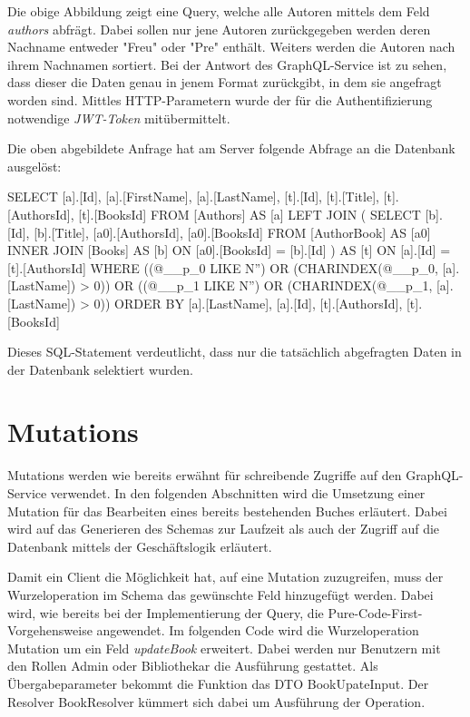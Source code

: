Die obige Abbildung zeigt eine Query, welche alle Autoren mittels dem Feld \textit{authors} abfrägt.
Dabei sollen nur jene Autoren zurückgegeben werden deren Nachname entweder "Freu" oder "Pre" enthält.
Weiters werden die Autoren nach ihrem Nachnamen sortiert.
Bei der Antwort des GraphQL-Service ist zu sehen, dass dieser die Daten genau in jenem Format zurückgibt, in dem sie angefragt worden sind.
Mittles HTTP-Parametern wurde der für die Authentifizierung notwendige \textit{JWT-Token} mitübermittelt.
\newline

Die oben abgebildete Anfrage hat am Server folgende Abfrage an die Datenbank ausgelöst:
\begin{JsCode}
SELECT [a].[Id], [a].[FirstName], [a].[LastName], [t].[Id], [t].[Title], [t].[AuthorsId], [t].[BooksId]
FROM [Authors] AS [a]
LEFT JOIN (
    SELECT [b].[Id], [b].[Title], [a0].[AuthorsId], [a0].[BooksId]
    FROM [AuthorBook] AS [a0]
    INNER JOIN [Books] AS [b] ON [a0].[BooksId] = [b].[Id]
) AS [t] ON [a].[Id] = [t].[AuthorsId]
WHERE ((@__p_0 LIKE N'') OR (CHARINDEX(@__p_0, [a].[LastName]) > 0)) OR ((@__p_1 LIKE N'') OR (CHARINDEX(@__p_1, [a].[LastName]) > 0))
ORDER BY [a].[LastName], [a].[Id], [t].[AuthorsId], [t].[BooksId]
\end{JsCode}

Dieses SQL-Statement verdeutlicht, dass nur die tatsächlich abgefragten Daten in der Datenbank selektiert wurden.

\section{Mutations}
Mutations werden wie bereits erwähnt für schreibende Zugriffe auf den GraphQL-Service verwendet.
In den folgenden Abschnitten wird die Umsetzung einer Mutation für das Bearbeiten eines bereits bestehenden Buches erläutert.
Dabei wird auf das Generieren des Schemas zur Laufzeit als auch der Zugriff auf die Datenbank mittels der Geschäftslogik erläutert.

Damit ein Client die Möglichkeit hat, auf eine Mutation zuzugreifen, muss der Wurzeloperation im Schema das gewünschte Feld hinzugefügt werden.
Dabei wird, wie bereits bei der Implementierung der Query, die Pure-Code-First-Vorgehensweise angewendet.
\newline
Im folgenden Code wird die Wurzeloperation Mutation um ein Feld \textit{updateBook} erweitert.
Dabei werden nur Benutzern mit den Rollen Admin oder Bibliothekar die Ausführung gestattet.
Als Übergabeparameter bekommt die Funktion das DTO BookUpateInput.
Der Resolver BookResolver kümmert sich dabei um Ausführung der Operation.

